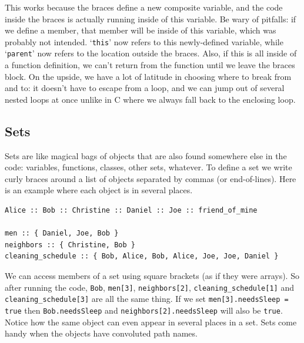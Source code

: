 \documentclass{article}
\newenvironment{code}{
       \begin{list}{}{
               \setlength{\leftmargin}{.4in}
               \setlength{\rightmargin}{0in}
               \setlength{\topsep}{.2in}
       }
       \small
       \item[] }
       { \end{list}   }
\begin{document}
\noindent This works because the braces define a new composite variable, and the code inside the braces is actually running inside of this variable.  Be wary of pitfalls:  if we define a member, that member will be inside of this variable, which was probably not intended.  `\verb#this#' now refers to this newly-defined variable, while `\verb#parent#' now refers to the location outside the braces.  Also, if this is all inside of a function definition, we can't return from the function until we leave the braces block.  On the upside, we have a lot of latitude in choosing where to break from and to:  it doesn't have to escape from a loop, and we can jump out of several nested loops at once unlike in C where we always fall back to the enclosing loop.








\subsection{Sets} 

Sets are like magical bags of objects that are also found somewhere else in the code:  variables, functions, classes, other sets, whatever.  To define a set we write curly braces around a list of objects separated by commas (or end-of-lines).  Here is an example where each object is in several places.

\begin{code} \begin{verbatim}
Alice :: Bob :: Christine :: Daniel :: Joe :: friend_of_mine

men :: { Daniel, Joe, Bob }
neighbors :: { Christine, Bob }
cleaning_schedule :: { Bob, Alice, Bob, Alice, Joe, Joe, Daniel }
\end{verbatim} \end{code}

\noindent We can access members of a set using square brackets (as if they were arrays).  So after running the code, \texttt{Bob}, \texttt{men[3]}, \texttt{neighbors[2]}, \texttt{cleaning\_schedule[1]} and \texttt{cleaning\_schedule[3]} are all the same thing.  If we set \verb#men[3].needsSleep = true# then \verb#Bob.needsSleep# and \verb#neighbors[2].needsSleep# will also be \verb#true#.  Notice how the same object can even appear in several places in a set.  Sets come handy when the objects have convoluted path names.
\end{document}
